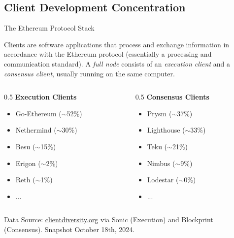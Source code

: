 \documentclass[12pt]{beamer}
\begin{document}
\subsection{Client Development Concentration}

\begin{frame}{The Ethereum Protocol Stack}

Clients are software applications that process and exchange information in accordance with the Ethereum protocol (essentially a processing and communication standard). A \textit{full node} consists of an \textit{execution client} and a \textit{consensus client}, usually running on the same computer. \vspace{0.8em}

    \begin{columns}
        \begin{column}{0.5\textwidth}
            \textbf{Execution Clients}\\
            \begin{itemize}
                \item Go-Ethereum ($\sim$52\%)
                \item Nethermind ($\sim$30\%)
                \item Besu ($\sim$15\%)
                \item Erigon ($\sim$2\%)
                \item Reth ($\sim$1\%)
                \item ...
            \end{itemize}
        \end{column}
        
        \begin{column}{0.5\textwidth}
            \textbf{Consensus Clients}\\
            \begin{itemize}
                \item Prysm ($\sim$37\%)
                \item Lighthouse ($\sim$33\%)
                \item Teku ($\sim$21\%)
                \item Nimbus ($\sim$9\%)
                \item Lodestar ($\sim$0\%)
                \item ...
            \end{itemize}
        \end{column}    
    \end{columns} \vfill
    
    \tiny{Data Source: \url{clientdiversity.org} via Sonic (Execution) and Blockprint (Consensus). Snapshot October 18th, 2024.}

\end{frame}
\end{document}
